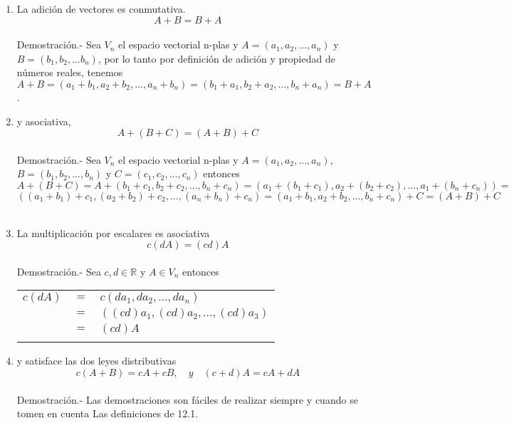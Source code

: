 \begin{teo}

\begin{enumerate}[\bfseries a.]
    \item La adición de vectores es conmutativa. $$A+B=B+A$$\\
	Demostración.-\; Sea $V_n$ el espacio vectorial n-plas y $A=(a_1,a_2,...,a_n)$ y $B=(b_1,b_2,...b_n)$, por lo tanto por definición de adición  y propiedad de números reales, tenemos $$A+B = (a_1+b_1,a_2+b_2,...,a_n+b_n) = (b_1+a_1,b_2+a_2,...,b_n+a_n) = B+A$$.\\

    \item y asociativa, $$A+(B+C) = (A+B)+C$$\\
	Demostración.-\; Sea $V_n$ el espacio vectorial n-plas y $A = (a_1,a_2,...,a_n)$, $B=(b_1,b_2,...,b_n)$ y $C=(c_1,c_2,...,c_n)$ entonces $$A+(B+C) = A + (b_1+c_1,b_2+c_2,...,b_n+c_n) = (a_1+(b_1+c_1),a_2+(b_2+c_2),...,a_1+(b_n+c_n)) = $$
	$$((a_1+b_1)+c_1,(a_2+b_2)+c_2,...,(a_n+b_n)+c_n) = (a_1+b_1,a_2+b_2,...,b_n+c_n)+C = (A+B)+C$$\\

    \item La multiplicación por escalares es asociativa $$c(dA)=(cd)A$$\\
	Demostración.-\; Sea $c,d \in \mathbb{R}$ y $A\in V_n$ entonces 
	\begin{center}
	    \begin{tabular}{rcl}
		$c(dA)$&$=$&$c(da_1,da_2,...,da_n)$\\
		&$=$&$((cd)a_1,(cd)a_2,...,(cd)a_3)$\\
		&$=$&$(cd)A$\\\\
	    \end{tabular}
	\end{center}

    \item y satisface las dos leyes distributivas $$c(A+B)=cA+cB,\quad y \quad (c+d)A=cA+dA$$\\
	Demostración.-\; Las demostraciones son fáciles de realizar siempre y cuando se tomen en cuenta Las definiciones de 12.1.\\\\


\end{enumerate}
\end{teo}
